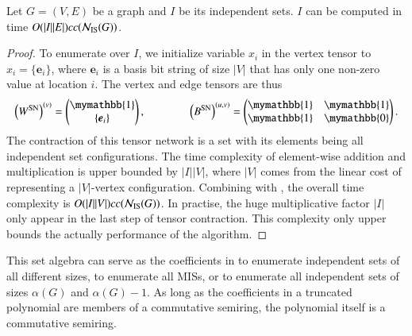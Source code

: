\documentclass[review, onefignum, onetabnum]{siamart190516}
\begin{document}
\begin{theorem}\label{thm:complexset}
    Let $G = (V, E)$ be a graph and $I$ be its independent sets.
    $I$ can be computed in time $O(|I||E|)cc({\mathcal{N}_{\rm IS}(G)})$.
\end{theorem}
\begin{proof}
To enumerate over $I$,  we initialize variable $x_{i}$ in the vertex tensor to $x_i = \{\boldsymbol{e}_{i}\}$, where $\boldsymbol{e}_i$ is a basis bit string of size $|V|$ that has only one non-zero value at location $i$.
The vertex and edge tensors are thus
\begin{equation}
    \left(W^{\rm SN}\right)^{(v)} = \left(\begin{matrix}
        \mymathbb{1} \\
        \{\boldsymbol{e}_{i}\}
    \end{matrix}\right),   
    \qquad \qquad
        \left(B^{\rm SN}\right)^{(u, v)} = \left(\begin{matrix}
        \mymathbb{1}  & \mymathbb{1} \\
        \mymathbb{1} & \mymathbb{0}
    \end{matrix}\right).
\end{equation}
The contraction of this tensor network is a set with its elements being all independent set configurations. The time complexity of element-wise addition and multiplication is upper bounded by $|I||V|$, where $|V|$ comes from the linear cost of representing a $|V|$-vertex configuration. Combining with , the overall time complexity is $O(|I||V|)cc({\mathcal{N}_{\rm IS}(G)})$.
In practise, the huge multiplicative factor $|I|$ only appear in the last step of tensor contraction.
This complexity only upper bounds the actually performance of the algorithm.
\end{proof}

This set algebra can serve as the coefficients in  to enumerate independent sets of all different sizes,  to enumerate all MISs, or  to enumerate all independent sets of sizes $\alpha(G)$ and $\alpha(G)-1$.
As long as the coefficients in a truncated polynomial are members of a commutative semiring, the polynomial itself is a commutative semiring.
\end{document}
